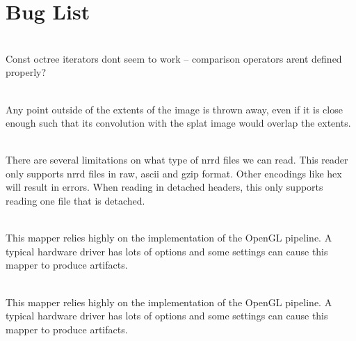 \chapter{Bug List }
\hypertarget{bug}{}\label{bug}

\begin{DoxyRefList}
\item[{\parbox[t]{\linewidth}{Class \doxylink{classoctree__iterator}{octree\+\_\+iterator\texorpdfstring{$<$}{<} T\+\_\+, R\+\_\+, P\+\_\+, O\+\_\+, OP\+\_\+, d\+\_\+ \texorpdfstring{$>$}{>}} }}]\hfill \\
\label{bug__bug000001}%
%
Const octree iterators don\textquotesingle{}t seem to work -- comparison operators aren\textquotesingle{}t defined properly?  
\item[{\parbox[t]{\linewidth}{Class \doxylink{classvtk_fast_splatter}{vtk\+Fast\+Splatter} }}]\hfill \\
\label{bug__bug000002}%
%
 Any point outside of the extents of the image is thrown away, even if it is close enough such that it\textquotesingle{}s convolution with the splat image would overlap the extents. 
\item[{\parbox[t]{\linewidth}{Class \doxylink{classvtk_nrrd_reader}{vtk\+Nrrd\+Reader} }}]\hfill \\
\label{bug__bug000003}%
%
 There are several limitations on what type of nrrd files we can read. This reader only supports nrrd files in raw, ascii and gzip format. Other encodings like hex will result in errors. When reading in detached headers, this only supports reading one file that is detached. 
\item[{\parbox[t]{\linewidth}{Class \doxylink{classvtk_open_g_l_projected_tetrahedra_mapper}{vtk\+Open\+GLProjected\+Tetrahedra\+Mapper} }}]\hfill \\
\label{bug__bug000004}%
%
 This mapper relies highly on the implementation of the Open\+GL pipeline. A typical hardware driver has lots of options and some settings can cause this mapper to produce artifacts. 
\item[{\parbox[t]{\linewidth}{Class \doxylink{classvtk_projected_tetrahedra_mapper}{vtk\+Projected\+Tetrahedra\+Mapper} }}]\hfill \\
\label{bug__bug000005}%
%
 This mapper relies highly on the implementation of the Open\+GL pipeline. A typical hardware driver has lots of options and some settings can cause this mapper to produce artifacts. 

\end{DoxyRefList}
